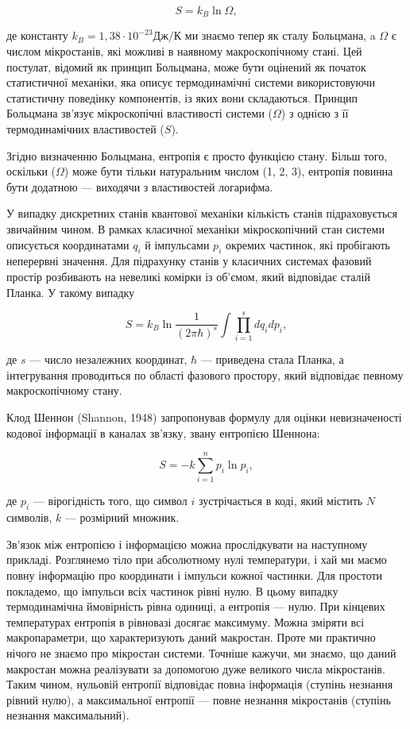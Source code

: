 \documentclass[
  letterpaper,
]{report}
\begin{document}
\[ 
S = k_{B}\ln{\Omega}, 
\]

де константу \(k_{B} = 1,38 \cdot 10^{-23} Дж/К\) ми знаємо тепер як
сталу Больцмана, a \(\Omega\) є числом мікростанів, які можливі в
наявному макроскопічному стані. Цей постулат, відомий як принцип
Больцмана, може бути оцінений як початок статистичної механіки, яка
описує термодинамічні системи використовуючи статистичну поведінку
компонентів, із яких вони складаються. Принцип Больцмана зв'язує
мікроскопічні властивості системи (\(\Omega\)) з однією з її
термодинамічних властивостей (\(S\)).

Згідно визначенню Больцмана, ентропія є просто функцією стану. Більш
того, оскільки (\(\Omega\)) може бути тільки натуральним числом (1, 2,
3), ентропія повинна бути додатною --- виходячи з властивостей
логарифма.

У випадку дискретних станів квантової механіки кількість станів
підраховується звичайним чином. В рамках класичної механіки
мікроскопічний стан системи описується координатами \(q_{i}\) й
імпульсами \(p_{i}\) окремих частинок, які пробігають неперервні
значення. Для підрахунку станів у класичних системах фазовий простір
розбивають на невеликі комірки із об'ємом, який відповідає сталій
Планка. У такому випадку

\[ 
S = k_{B}\ln\frac{1}{( 2\pi\hbar )^{s}} \int \prod_{i=1}^{s} dq_{i}dp_{i}, 
\]

де \(s\) --- число незалежних координат, \(\hbar\) --- приведена стала
Планка, а інтегрування проводиться по області фазового простору, який
відповідає певному макроскопічному стану.

Клод Шеннон (Shannon, 1948) запропонував формулу для оцінки
невизначеності кодової інформації в каналах зв'язку, звану ентропією
Шеннона:

\[ 
S = -k\sum_{i=1}^{n}p_{i}\ln{p_{i}}, 
\]

де \(p_{i}\) --- вірогідність того, що символ \(i\) зустрічається в
коді, який містить \(N\) символів, \(k\) --- розмірний множник.

Зв'язок між ентропією і інформацією можна прослідкувати на наступному
прикладі. Розглянемо тіло при абсолютному нулі температури, і хай ми
маємо повну інформацію про координати і імпульси кожної частинки. Для
простоти покладемо, що імпульси всіх частинок рівні нулю. В цьому
випадку термодинамічна ймовірність рівна одиниці, а ентропія --- нулю.
При кінцевих температурах ентропія в рівновазі досягає максимуму. Можна
зміряти всі макропараметри, що характеризують даний макростан. Проте ми
практично нічого не знаємо про мікростан системи. Точніше кажучи, ми
знаємо, що даний макростан можна реалізувати за допомогою дуже великого
числа мікростанів. Таким чином, нульовій ентропії відповідає повна
інформація (ступінь незнання рівний нулю), а максимальної ентропії ---
повне незнання мікростанів (ступінь незнання максимальний).
\end{document}
